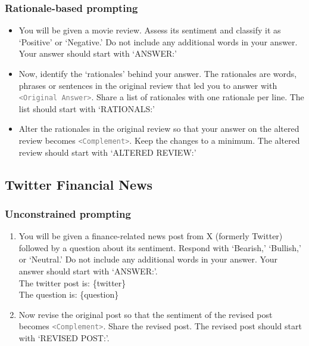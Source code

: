 \subsubsection{Rationale-based prompting}
\begin{itemize}
    \item You will be given a movie review. Assess its sentiment and classify it as `Positive' or `Negative.' Do not include any additional words in your answer. Your answer should start with `ANSWER:'
    \item Now, identify the `rationales' behind your answer. The rationales are words, phrases or sentences in the original review that led you to answer with \textcolor{gray}{\texttt{<Original Answer>}}. Share a list of rationales with one rationale per line. The list should start with `RATIONALS:'
    \item Alter the rationales in the original review so that your answer on the altered review becomes \textcolor{gray}{\texttt{<Complement>}}. Keep the changes to a minimum. The altered review should start with `ALTERED REVIEW:'
\end{itemize}




\subsection{Twitter Financial News}
\subsubsection{Unconstrained prompting}
\begin{enumerate}
    \item You will be given a finance-related news post from X (formerly Twitter) followed by a question about its sentiment. Respond with `Bearish,' `Bullish,' or `Neutral.' Do not include any additional words in your answer. Your answer should start with `ANSWER:'.\\
    The twitter post is: \{twitter\}\\
    The question is: \{question\}
    \item Now revise the original post so that the sentiment of the revised post becomes \textcolor{gray}{\texttt{<Complement>}}. Share the revised post. The revised post should start with `REVISED POST:'.
\end{enumerate}
